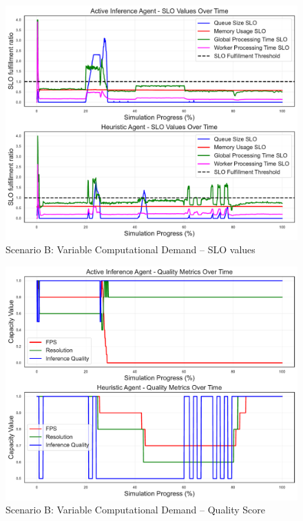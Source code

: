 \begin{figure}[h]
    \centering
    \includegraphics[width=\textwidth]{img/results/variable_computational_demand/none_combined_slo_values.pdf}
    \caption{Scenario B: Variable Computational Demand -- SLO values}
    \label{fig:evaluation-demand-slo-values-comparison}
\end{figure}

\begin{figure}[h]
    \centering
    \includegraphics[width=\textwidth]{img/results/variable_computational_demand/none_combined_quality_metrics.pdf}
    \caption{Scenario B: Variable Computational Demand -- Quality Score}
    \label{fig:evaluation-demand-metrics-comparison}
\end{figure}


